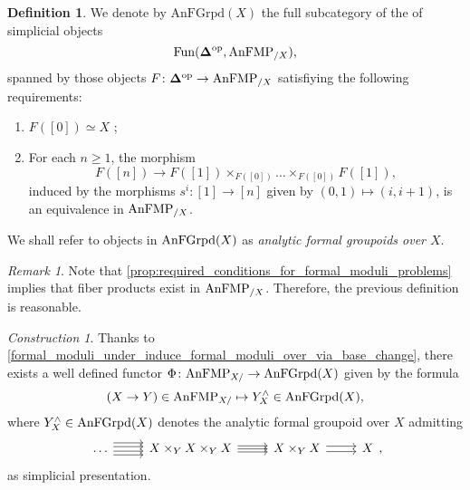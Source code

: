 \documentclass[10pt,a4paper,reqno]{amsart} %
\theoremstyle{plain}
\theoremstyle{definition}
\newtheorem{defin}[thm]{Definition}
\theoremstyle{remark}
\newtheorem{rem}[thm]{Remark}
\numberwithin{equation}{section}
\newtheorem{construction}[thm]{Construction}
\begin{document}
\begin{defin}We denote by
    $\mathrm{AnFGrpd}(X)$ the full subcategory of the \infcat of simplicial objects
        \[
            \operatorname{Fun}( \bm{\Delta} ^\mathrm{op}, \mathrm{AnFMP}_{/X}),
        \]
    spanned by those objects $F \colon \mathbf \Delta ^\mathrm{op} \to \mathrm{AnFMP}_{/X}$ satisfiying the following requirements:
        \begin{enumerate}
            \item $F([0]) \simeq X$ ;
            \item For each $n \ge 1$, the morphism
                \[
                    F([n]) \to F([1]) \times_{F([0])} \dots \times_{F([0])} F([1])  ,
                \]
            induced by the morphisms $s^i \colon [1] \to [n]$ given by $(0,1) \mapsto (i, i+1)$, is an equivalence
            in $\mathrm{AnFMP}_{/X}$.
        \end{enumerate}
    We shall refer to objects in $\mathrm{AnFGrpd}(X)$ as \emph{analytic formal groupoids over $X$}.
\end{defin}

\begin{rem}
    Note that \cref{prop:required_conditions_for_formal_moduli_problems} implies that fiber products exist in $\mathrm{AnFMP}_{/X}$. Therefore, the previous
    definition is reasonable.
\end{rem}



\begin{construction} \label{const:formal_completion_construction_Phi} Thanks to \cref{formal_moduli_under_induce_formal_moduli_over_via_base_change},
there exists a well defined functor $\Phi \colon \mathrm{AnFMP}_{X/} \to \mathrm{AnFGrpd}(X)$ given by the formula
    \[
        (X \to Y ) \in \mathrm{AnFMP}_{X/ } \mapsto Y^\wedge_X \in \mathrm{AnFGrpd}(X),
    \]
where $Y^\wedge_X \in \mathrm{AnFGrpd}(X)$ denotes the analytic formal groupoid over $X$ admitting
    \[
    \begin{tikzcd}
      \dots \ar[r, shift left=2] \ar[r, shift left=0.75] 
      \ar[r, shift left=-0.75] \ar[r, shift left=-2]
      & X \times_Y X \times_Y X \ar[r, shift left=-1] \ar[r, shift left=1] \ar[r] 
      & X \times_Y X \ar[r, shift left=-0.5ex] \ar[r, shift left=0.5ex] 
      & X 
    \end{tikzcd},
    \] 
as simplicial presentation.
\end{construction}
\end{document}
